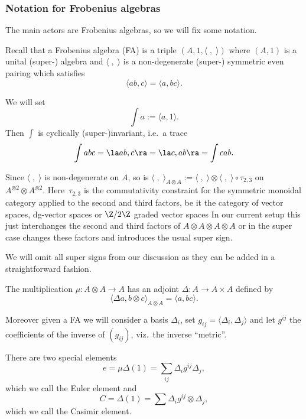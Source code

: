 \subsubsection{Notation for Frobenius algebras}
The main actors are  Frobenius algebras, so we will f\/ix some notation.

Recall that a Frobenius algebra (FA) is a triple $(A,1, \langle \; ,\;\rangle)$
where $(A,1)$ is a unital (super-) algebra and $\langle \; ,\;\rangle$ is a non-degenerate
(super-) symmetric even pairing which satisf\/ies
\begin{equation*}
\langle ab,c\rangle=\langle a,bc\rangle.
\end{equation*}

We will set
\begin{equation*}
\int a :=\langle a , 1 \rangle.
\end{equation*}
Then $\int$ is cyclically (super-)invariant, i.e.\ a trace
\begin{equation*}
\int abc = \la ab,c\ra =\la c, ab\ra=\int cab.
\end{equation*}


Since $ \langle \; ,\;\rangle$ is non-degenerate on $A$, so is $
\langle \; ,\;\rangle_{A\otimes A}:=\langle \; ,\;\rangle\otimes
\langle \; ,\;\rangle\circ \tau_{2,3}$ on $A^{\otimes 2}\otimes
A^{\otimes 2}$. Here~$\tau_{2,3}$ is the commutativity constraint
for the symmetric monoidal category applied to the second and third
factors, be it the category of vector spaces, dg-vector spaces or
$\Z/2\Z$ graded vector spaces
 In our current setup this just interchanges the second and third  factors of
$A\otimes A\otimes A\otimes A$  or in the super case changes these factors and introduces
the usual super sign.

We will omit all super signs from our discussion as they can be added in a straightforward fashion.

The multiplication $\mu:A\otimes A\to A$ has an adjoint $\Delta: A\to A\times A$
def\/ined by
\begin{equation}
\label{inveq} \langle \Delta a, b\otimes c\rangle_{A\otimes
A}=\langle a,bc\rangle.
\end{equation}

Moreover given a FA we will consider a basis $\Delta_i$, set $g_{ij}=\langle \Delta_i,\Delta_j\rangle$
and let $g^{ij}$ the coef\/f\/icients of the inverse of $(g_{ij})$, viz.\ the inverse ``metric''.

There are two special elements
\begin{equation*}
e=\mu\Delta(1)=\sum_{ij} \Delta_i g^{ij}\Delta_j,
\end{equation*}
which we call the Euler element and
\begin{equation*}
C=\Delta(1)=\sum \Delta_i g^{ij} \otimes \Delta_j,
\end{equation*}
which we call the Casimir element.

